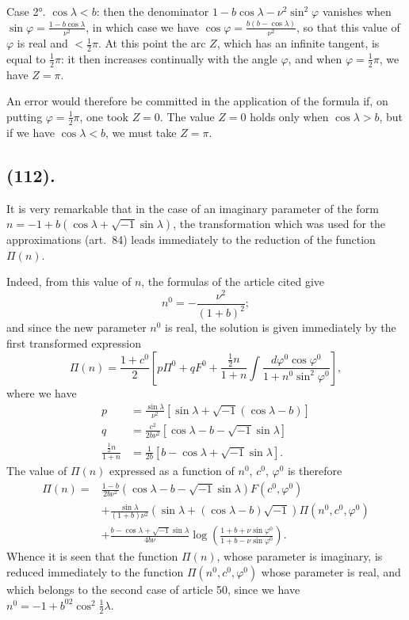 \documentclass{article}
\begin{document}
Case 2°. $\cos\lambda<b$: then the denominator $1-b\cos\lambda-\nu^{2}\sin^{2}\varphi$ vanishes when $\sin\varphi=\frac{1-b\cos\lambda}{\nu^{2}}$, in which case we have $\cos\varphi=\frac{b(b-\cos\lambda)}{\nu^{2}}$, so that this value of $\varphi$ is real and $<\frac{1}{2}\pi$. At this point the arc $Z$, which has an infinite tangent, is equal to $\frac{1}{2}\pi$: it then increases continually with the angle $\varphi$, and when $\varphi=\frac{1}{2}\pi$, we have $Z=\pi$.

An error would therefore be committed in the application of the formula if, on putting $\varphi=\frac{1}{2}\pi$, one took $Z=0$. The value $Z=0$ holds only when $\cos\lambda>b$, but if we have $\cos\lambda<b$, we must take $Z=\pi$.

\subsection*{(112).}

It is very remarkable that in the case of an imaginary parameter of the form $n=-1+b(\cos\lambda+\sqrt{-1}\sin\lambda)$, the transformation which was used for the approximations (art.\ 84) leads immediately to the reduction of the function $\Pi(n)$.

Indeed, from this value of $n$, the formulas of the article cited give
\[ n^{0}=-\frac{\nu^{2}}{(1+b)^{2}}; \]
and since the new parameter $n^{0}$ is real, the solution is given immediately by the first transformed expression
\[ \Pi(n)=\frac{1+c^{0}}{2}\left[p\Pi^{0}+qF^{0}+\frac{\tfrac{1}{2}n}{1+n}\int\frac{d\varphi^{0}\cos\varphi^{0}}{1+n^{0}\sin^{2}\varphi^{0}}\right], \]
where we have
\[ \begin{aligned} p&=\frac{\sin\lambda}{\nu^{2}}[\sin\lambda+\sqrt{-1}(\cos\lambda-b)]\\ q&=\frac{c^{2}}{2b\nu^{2}}[\cos\lambda-b-\sqrt{-1}\sin\lambda]\\ \frac{\tfrac{1}{2}n}{1+n}&=\frac{1}{2b}[b-\cos\lambda+\sqrt{-1}\sin\lambda]. \end{aligned} \]
The value of $\Pi(n)$ expressed as a function of $n^{0}$, $c^{0}$, $\varphi^{0}$ is therefore
\[ \begin{aligned} \Pi(n)={}&\frac{1-b}{2b\nu^{2}}(\cos\lambda-b-\sqrt{-1}\sin\lambda)F(c^{0},\varphi^{0})\\ &+\frac{\sin\lambda}{(1+b)\nu^{2}}(\sin\lambda+(\cos\lambda-b)\sqrt{-1})\Pi(n^{0},c^{0},\varphi^{0})\\ &+\frac{b-\cos\lambda+\sqrt{-1}\sin\lambda}{4b\nu}\log\left(\frac{1+b+\nu\sin\varphi^{0}}{1+b-\nu\sin\varphi^{0}}\right). \end{aligned} \]
Whence it is seen that the function $\Pi(n)$, whose parameter is imaginary, is reduced immediately to the function $\Pi(n^{0},c^{0},\varphi^{0})$ whose parameter is real, and which belongs to the second case of article 50, since we have $n^{0}=-1+b^{02}\cos^{2}\frac{1}{2}\lambda$.
\end{document}
